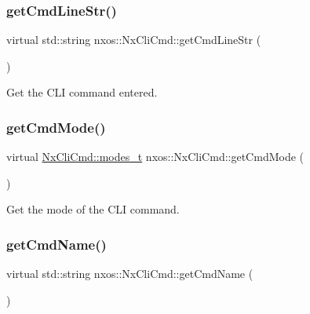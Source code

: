 \subsubsection{\texorpdfstring{get\+Cmd\+Line\+Str()}{getCmdLineStr()}}
{\footnotesize\ttfamily virtual std\+::string nxos\+::\+Nx\+Cli\+Cmd\+::get\+Cmd\+Line\+Str (\begin{DoxyParamCaption}{ }\end{DoxyParamCaption})\hspace{0.3cm}{\ttfamily [pure virtual]}}



Get the C\+LI command entered. 

\mbox{\label{classnxos_1_1_nx_cli_cmd_a8ac3fe47522ba60987babb8c830153ff}} 
\subsubsection{\texorpdfstring{get\+Cmd\+Mode()}{getCmdMode()}}
{\footnotesize\ttfamily virtual \mbox{\hyperlink{classnxos_1_1_nx_cli_cmd_a72999b2e8f2995bbb19be346d875e3ce}{Nx\+Cli\+Cmd\+::modes\+\_\+t}} nxos\+::\+Nx\+Cli\+Cmd\+::get\+Cmd\+Mode (\begin{DoxyParamCaption}{ }\end{DoxyParamCaption})\hspace{0.3cm}{\ttfamily [pure virtual]}}



Get the mode of the C\+LI command. 

\mbox{\label{classnxos_1_1_nx_cli_cmd_acf95739336bb525d749a8e73949cb887}} 
\subsubsection{\texorpdfstring{get\+Cmd\+Name()}{getCmdName()}}
{\footnotesize\ttfamily virtual std\+::string nxos\+::\+Nx\+Cli\+Cmd\+::get\+Cmd\+Name (\begin{DoxyParamCaption}{ }\end{DoxyParamCaption})\hspace{0.3cm}{\ttfamily [pure virtual]}}



